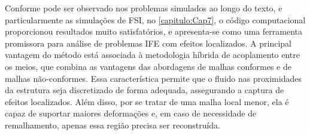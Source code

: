 Conforme pode ser observado nos problemas simulados ao longo do texto, e particularmente as simulações de FSI, no \autoref{capitulo:Cap7}, o código computacional proporcionou resultados muito satisfatórios, e apresenta-se como uma ferramenta promissora para análise de problemas IFE com efeitos localizados. A principal vantagem do método está associada à metodologia híbrida de acoplamento entre os meios, que combina as vantagens das abordagens de malhas conformes e de malhas não-conformes. Essa característica permite que o fluido nas proximidades da estrutura seja discretizado de forma adequada, assegurando a captura de efeitos localizados. Além disso, por se tratar de uma malha local menor, ela é capaz de suportar maiores deformações e, em caso de necessidade de remalhamento, apenas essa região precisa ser reconstruída.
